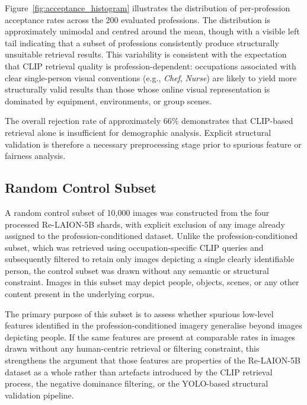 Figure~\ref{fig:acceptance_histogram} illustrates the distribution of per-profession acceptance rates across the 200 evaluated professions. The distribution is approximately unimodal and centred around the mean, though with a visible left tail indicating that a subset of professions consistently produce structurally unsuitable retrieval results. This variability is consistent with the expectation that CLIP retrieval quality is profession-dependent: occupations associated with clear single-person visual conventions (e.g., \emph{Chef}, \emph{Nurse}) are likely to yield more structurally valid results than those whose online visual representation is dominated by equipment, environments, or group scenes.

The overall rejection rate of approximately 66\% demonstrates that CLIP-based retrieval alone is insufficient for demographic analysis. Explicit structural validation is therefore a necessary preprocessing stage prior to spurious feature or fairness analysis.


\subsection{Random Control Subset}
\label{subsec:random_control}

A random control subset of 10{,}000 images was constructed from the four processed Re-LAION-5B shards, with explicit exclusion of any image already assigned to the profession-conditioned dataset. Unlike the profession-conditioned subset, which was retrieved using occupation-specific CLIP queries and subsequently filtered to retain only images depicting a single clearly identifiable person, the control subset was drawn without any semantic or structural constraint. Images in this subset may depict people, objects, scenes, or any other content present in the underlying corpus.

The primary purpose of this subset is to assess whether spurious low-level features identified in the profession-conditioned imagery generalise beyond images depicting people. If the same features are present at comparable rates in images drawn without any human-centric retrieval or filtering constraint, this strengthens the argument that those features are properties of the Re-LAION-5B dataset as a whole rather than artefacts introduced by the CLIP retrieval process, the negative dominance filtering, or the YOLO-based structural validation pipeline.

